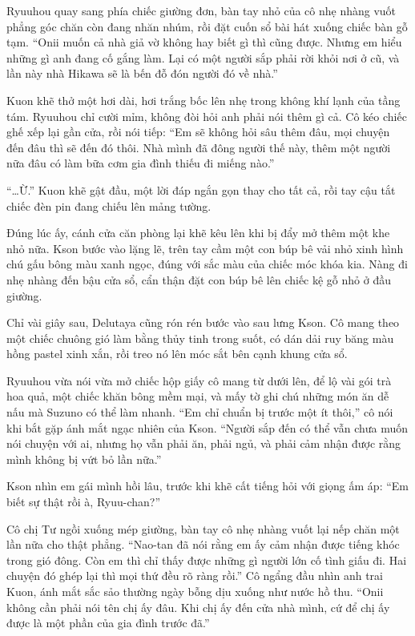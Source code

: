 ﻿\documentclass[../main.tex]{subfiles}
\begin{document}
Ryuuhou quay sang phía chiếc giường đơn, bàn tay nhỏ của cô nhẹ nhàng vuốt phẳng góc chăn còn đang nhăn nhúm, rồi đặt cuốn sổ bài hát xuống chiếc bàn gỗ tạm. ``Onii muốn cả nhà giả vờ không hay biết gì thì cũng được. Nhưng em hiểu những gì anh đang cố gắng làm. Lại có một người sắp phải rời khỏi nơi ở cũ, và lần này nhà Hikawa sẽ là bến đỗ đón người đó về nhà.''

Kuon khẽ thở một hơi dài, hơi trắng bốc lên nhẹ trong không khí lạnh của tầng tám. Ryuuhou chỉ cười mỉm, không đòi hỏi anh phải nói thêm gì cả. Cô kéo chiếc ghế xếp lại gần cửa, rồi nói tiếp: ``Em sẽ không hỏi sâu thêm đâu, mọi chuyện đến đâu thì sẽ đến đó thôi. Nhà mình đã đông người thế này, thêm một người nữa đâu có làm bữa cơm gia đình thiếu đi miếng nào.''

``\dots Ừ.'' Kuon khẽ gật đầu, một lời đáp ngắn gọn thay cho tất cả, rồi tay cậu tắt chiếc đèn pin đang chiếu lên mảng tường.

Đúng lúc ấy, cánh cửa căn phòng lại khẽ kêu lên khi bị đẩy mở thêm một khe nhỏ nữa. Kson bước vào lặng lẽ, trên tay cầm một con búp bê vải nhỏ xinh hình chú gấu bông màu xanh ngọc, đúng với sắc màu của chiếc móc khóa kia. Nàng đi nhẹ nhàng đến bậu cửa sổ, cẩn thận đặt con búp bê lên chiếc kệ gỗ nhỏ ở đầu giường.

Chỉ vài giây sau, Delutaya cũng rón rén bước vào sau lưng Kson. Cô mang theo một chiếc chuông gió làm bằng thủy tinh trong suốt, có dán dải ruy băng màu hồng pastel xinh xắn, rồi treo nó lên móc sắt bên cạnh khung cửa sổ.

Ryuuhou vừa nói vừa mở chiếc hộp giấy cô mang từ dưới lên, để lộ vài gói trà hoa quả, một chiếc khăn bông mềm mại, và mấy tờ ghi chú những món ăn dễ nấu mà Suzuno có thể làm nhanh. ``Em chỉ chuẩn bị trước một ít thôi,'' cô nói khi bắt gặp ánh mắt ngạc nhiên của Kson. ``Người sắp đến có thể vẫn chưa muốn nói chuyện với ai, nhưng họ vẫn phải ăn, phải ngủ, và phải cảm nhận được rằng mình không bị vứt bỏ lần nữa.''

Kson nhìn em gái mình hồi lâu, trước khi khẽ cất tiếng hỏi với giọng ấm áp: ``Em biết sự thật rồi à, Ryuu-chan?''

Cô chị Tư ngồi xuống mép giường, bàn tay cô nhẹ nhàng vuốt lại nếp chăn một lần nữa cho thật phẳng. ``Nao-tan đã nói rằng em ấy cảm nhận được tiếng khóc trong gió đông. Còn em thì chỉ thấy được những gì người lớn cố tình giấu đi. Hai chuyện đó ghép lại thì mọi thứ đều rõ ràng rồi.'' Cô ngẩng đầu nhìn anh trai Kuon, ánh mắt sắc sảo thường ngày bỗng dịu xuống như nước hồ thu. ``Onii không cần phải nói tên chị ấy đâu. Khi chị ấy đến cửa nhà mình, cứ để chị ấy được là một phần của gia đình trước đã.''
\end{document}
